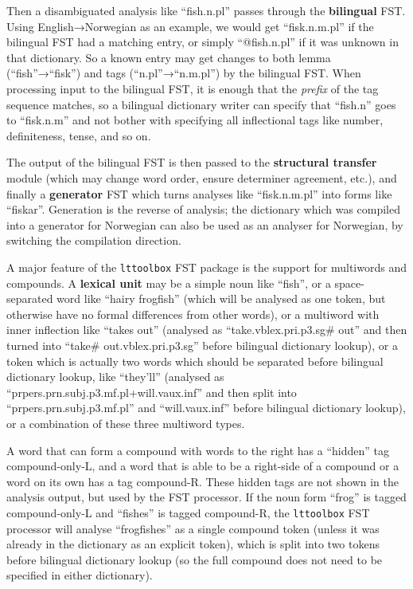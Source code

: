 \documentclass[11pt]{article}
\begin{document}
Then a disambiguated analysis like ``fish.n.pl'' passes through the
\textbf{bilingual} FST. Using English→Norwegian as an example, we
would get ``fisk.n.m.pl'' if the bilingual FST had a matching entry,
or simply ``@fish.n.pl'' if it was unknown in that dictionary. So a
known entry may get changes to both lemma (``fish''→``fisk'') and tags
(``n.pl''→``n.m.pl'') by the bilingual FST. When processing input to
the bilingual FST, it is enough that the \emph{prefix} of the tag
sequence matches, so a bilingual dictionary writer can specify that
``fish.n'' goes to ``fisk.n.m'' and not bother with specifying all
inflectional tags like number, definiteness, tense, and so on.

The output of the bilingual FST is then passed to the
\textbf{structural transfer} module (which may change word order,
ensure determiner agreement, etc.), and finally a \textbf{generator}
FST which turns analyses like ``fisk.n.m.pl'' into forms like
``fiskar''. Generation is the reverse of analysis; the dictionary
which was compiled into a generator for Norwegian can also be used as
an analyser for Norwegian, by switching the compilation direction.

A major feature of the \texttt{lttoolbox} FST package is the support
for multiwords and compounds. A \textbf{lexical unit} may be a simple
noun like ``fish'', or a space-separated word like ``hairy frogfish''
(which will be analysed as one token, but otherwise have no formal
differences from other words), or a multiword with inner inflection
like ``takes out'' (analysed as ``take.vblex.pri.p3.sg\# out'' and
then turned into ``take\# out.vblex.pri.p3.sg'' before bilingual
dictionary lookup), or a token which is actually two words which
should be separated before bilingual dictionary lookup, like
``they'll'' (analysed as ``prpers.prn.subj.p3.mf.pl+will.vaux.inf''
and then split into ``prpers.prn.subj.p3.mf.pl'' and ``will.vaux.inf''
before bilingual dictionary lookup), or a combination of these three
multiword types. 

A word that can form a compound with words to the right has a
``hidden'' tag compound-only-L, and a word that is able to be a
right-side of a compound or a word on its own has a tag compound-R.
These hidden tags are not shown in the analysis output, but used by
the FST processor. If the noun form ``frog'' is tagged compound-only-L
and ``fishes'' is tagged compound-R, the \texttt{lttoolbox} FST
processor will analyse ``frogfishes'' as a single compound token
(unless it was already in the dictionary as an explicit token), which
is split into two tokens before bilingual dictionary lookup (so the
full compound does not need to be specified in either dictionary).
\end{document}
